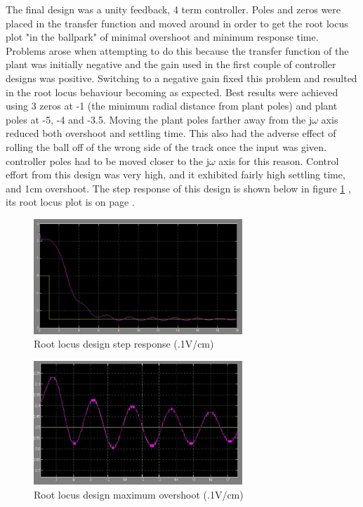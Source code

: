 The final design was a unity feedback, 4 term controller. Poles and zeros were placed in the transfer function and moved around in order to get the root locus plot "in the ballpark" of minimal overshoot and minimum response time. Problems arose when attempting to do this because the transfer function of the plant was initially negative and the gain used in the first couple of controller designs was positive. Switching to a negative gain fixed this problem and resulted in the root locus behaviour becoming as expected. Best results were achieved using 3 zeros at -1 (the minimum radial distance from plant poles) and plant poles at -5, -4 and -3.5. Moving the plant poles farther away from the j$\omega$ axis reduced both overshoot and settling time. This also had the adverse effect of rolling the ball off of the wrong side of the track once the input was given. controller poles had to be moved closer to the j$\omega$ axis for this reason. Control effort from this design was very high, and it exhibited fairly high settling time, and 1cm overshoot. The step response of this design is shown below in figure  \ref{3:fig:stepresponse} , its root locus plot is on page \pageref{2:fig:rlocus}.


\begin{figure}[h]
	\centering
		\includegraphics[width=0.70\textwidth]{pics/stepresponse}
	\caption{Root locus design step response (.1V/cm)}
	\label{3:fig:stepresponse}
\end{figure}
\begin{figure}[h]
	\centering
		\includegraphics[width=0.70\textwidth]{pics/maximumovershoot}
	\caption{Root locus design maximum overshoot (.1V/cm)}
	\label{3:fig:maximumovershoot}
\end{figure}
\FloatBarrier


